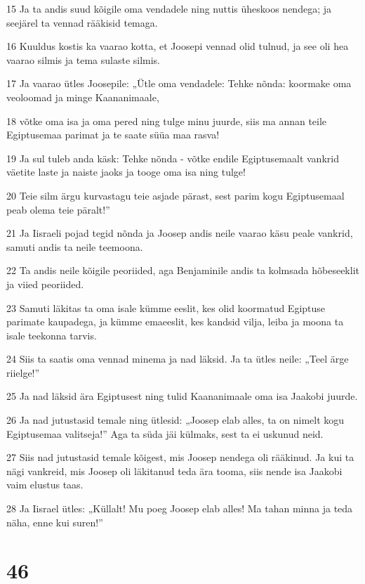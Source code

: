 \par 15 Ja ta andis suud kõigile oma vendadele ning nuttis üheskoos nendega; ja seejärel ta vennad rääkisid temaga.
\par 16 Kuuldus kostis ka vaarao kotta, et Joosepi vennad olid tulnud, ja see oli hea vaarao silmis ja tema sulaste silmis.
\par 17 Ja vaarao ütles Joosepile: „Ütle oma vendadele: Tehke nõnda: koormake oma veoloomad ja minge Kaananimaale,
\par 18 võtke oma isa ja oma pered ning tulge minu juurde, siis ma annan teile Egiptusemaa parimat ja te saate süüa maa rasva!
\par 19 Ja sul tuleb anda käsk: Tehke nõnda - võtke endile Egiptusemaalt vankrid väetite laste ja naiste jaoks ja tooge oma isa ning tulge!
\par 20 Teie silm ärgu kurvastagu teie asjade pärast, sest parim kogu Egiptusemaal peab olema teie päralt!”
\par 21 Ja Iisraeli pojad tegid nõnda ja Joosep andis neile vaarao käsu peale vankrid, samuti andis ta neile teemoona.
\par 22 Ta andis neile kõigile peoriided, aga Benjaminile andis ta kolmsada hõbeseeklit ja viied peoriided.
\par 23 Samuti läkitas ta oma isale kümme eeslit, kes olid koormatud Egiptuse parimate kaupadega, ja kümme emaeeslit, kes kandsid vilja, leiba ja moona ta isale teekonna tarvis.
\par 24 Siis ta saatis oma vennad minema ja nad läksid. Ja ta ütles neile: „Teel ärge riielge!”
\par 25 Ja nad läksid ära Egiptusest ning tulid Kaananimaale oma isa Jaakobi juurde.
\par 26 Ja nad jutustasid temale ning ütlesid: „Joosep elab alles, ta on nimelt kogu Egiptusemaa valitseja!” Aga ta süda jäi külmaks, sest ta ei uskunud neid.
\par 27 Siis nad jutustasid temale kõigest, mis Joosep nendega oli rääkinud. Ja kui ta nägi vankreid, mis Joosep oli läkitanud teda ära tooma, siis nende isa Jaakobi vaim elustus taas.
\par 28 Ja Iisrael ütles: „Küllalt! Mu poeg Joosep elab alles! Ma tahan minna ja teda näha, enne kui suren!”

\chapter{46}

